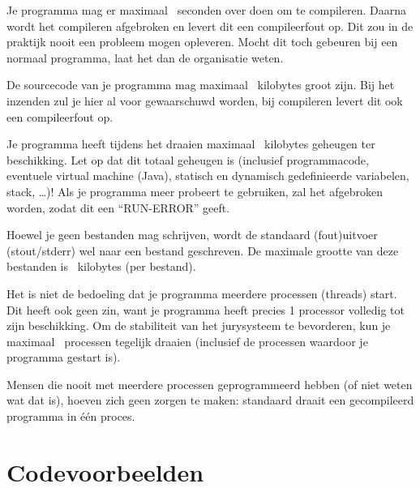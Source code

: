 \begin{description}
\item[compile-tijd]
Je programma mag er maximaal \COMPILETIME\ seconden over doen om te
compileren. Daarna wordt het compileren afgebroken en levert dit een
compileerfout op. Dit zou in de praktijk nooit een probleem mogen
opleveren. Mocht dit toch gebeuren bij een normaal programma, laat het
dan de organisatie weten.

\item[source grootte]
De sourcecode van je programma mag maximaal \SOURCESIZE\ kilobytes
groot zijn. Bij het inzenden zul je hier al voor gewaarschuwd worden,
bij compileren levert dit ook een compileerfout op.

\item[geheugen]
Je programma heeft tijdens het draaien maximaal \MEMLIMIT\ kilobytes
geheugen ter beschikking. Let op dat dit totaal geheugen is (inclusief
programmacode, eventuele virtual machine (Java), statisch en dynamisch
gedefinieerde variabelen, stack, \dots)! Als je programma meer
probeert te gebruiken, zal het afgebroken worden, zodat dit een
``RUN-ERROR'' geeft.

\item[bestandsgrootte]
Hoewel je geen bestanden mag schrijven, wordt de standaard (fout)uitvoer
(stout/stderr) wel naar een bestand geschreven. De maximale grootte
van deze bestanden is \FILELIMIT\ kilobytes (per bestand).

\item[aantal processen]
Het is niet de bedoeling dat je programma meerdere processen (threads)
start. Dit heeft ook geen zin, want je programma heeft precies 1
processor volledig tot zijn beschikking. Om de stabiliteit van het
jurysysteem te bevorderen, kun je maximaal \PROCLIMIT\ processen
tegelijk draaien (inclusief de processen waardoor je programma
gestart is).

Mensen die nooit met meerdere processen geprogrammeerd hebben (of
niet weten wat dat is), hoeven zich geen zorgen te maken: standaard
draait een gecompileerd programma in \'e\'en proces.

\end{description}


\newpage
\appendix

\section{Codevoorbeelden}\label{codeexamples}

